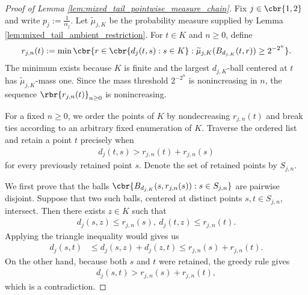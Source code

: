 \documentclass[11pt]{article}
\begin{document}
\begin{proof}[Proof of Lemma
\ref{lem:mixed_tail_pointwise_measure_chain}]
Fix $j\in\cbr{1,2}$ and write $p_j:=\frac{1}{\alpha_j}$.
Let $\widetilde\mu_{j,K}$ be the probability measure supplied by
Lemma \ref{lem:mixed_tail_ambient_restriction}. For $t\in K$ and
$n\ge0$, define
\begin{align*}
r_{j,n}(t)
:=
\min\cbr{
r\in\cbr{d_j(t,s):s\in K}:
\widetilde\mu_{j,K}(B_{d_{j,K}}(t,r))
\ge2^{-2^n}
}.
\end{align*}
The minimum exists because $K$ is finite and the largest
$d_{j,K}$-ball centered at $t$ has
$\widetilde\mu_{j,K}$-mass one. Since the mass threshold
$2^{-2^n}$ is nonincreasing in $n$, the sequence
$\rbr{r_{j,n}(t)}_{n\ge0}$ is nonincreasing.

For a fixed $n\ge0$, we order the points of $K$ by nondecreasing
$r_{j,n}(t)$ and break ties according to an arbitrary fixed enumeration
of $K$. Traverse the ordered list and retain a point $t$ precisely when
\begin{align*}
d_j(t,s)
>
r_{j,n}(t)+r_{j,n}(s)
\end{align*}
for every previously retained point $s$. Denote the set of retained
points by $S_{j,n}$.

We first prove that the balls $\cbr{
B_{d_{j,K}}(s,r_{j,n}(s)):
s\in S_{j,n}
}$ are pairwise disjoint. Suppose that two such balls, centered at
distinct points $s,t\in S_{j,n}$, intersect. Then there exists
$z\in K$ such that
\begin{align*}
d_j(s,z)\le r_{j,n}(s),
\ 
d_j(t,z)\le r_{j,n}(t).
\end{align*}
Applying the triangle inequality would gives us
\begin{align*}
d_j(s,t)
&\le
d_j(s,z)+d_j(z,t)\le
r_{j,n}(s)+r_{j,n}(t).
\end{align*}
On the other hand, because both $s$ and $t$ were retained, the greedy
rule gives
\begin{align*}
d_j(s,t)
>
r_{j,n}(s)+r_{j,n}(t),
\end{align*}
which is a contradiction.


\end{proof}
\end{document}
